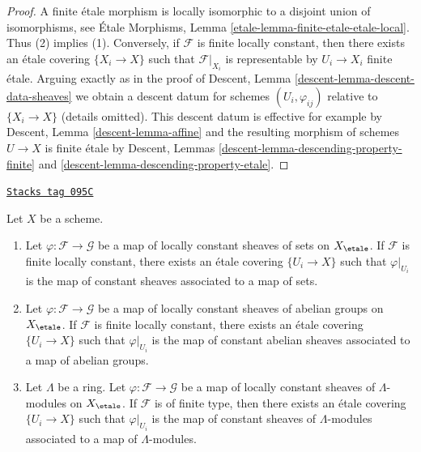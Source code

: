 \begin{proof}
A finite \'etale morphism is locally isomorphic to a disjoint union
of isomorphisms, see
\'Etale Morphisms, Lemma \ref{etale-lemma-finite-etale-etale-local}.
Thus (2) implies (1). Conversely, if $\mathcal{F}$ is finite locally
constant, then there exists an \'etale covering $\{X_i \to X\}$ such that
$\mathcal{F}|_{X_i}$ is representable by $U_i \to X_i$ finite \'etale.
Arguing exactly as in the proof of
Descent, Lemma \ref{descent-lemma-descent-data-sheaves}
we obtain a descent datum for schemes $(U_i, \varphi_{ij})$ relative to
$\{X_i \to X\}$ (details omitted). This descent datum is effective for
example by Descent, Lemma \ref{descent-lemma-affine}
and the resulting morphism of schemes $U \to X$ is finite \'etale
by Descent, Lemmas \ref{descent-lemma-descending-property-finite} and
\ref{descent-lemma-descending-property-etale}.
\end{proof}

\begin{lemma}
\label{etale-cohomology-lemma-morphism-locally-constant}
\href{https://stacks.math.columbia.edu/tag/095C}{\texttt{Stacks tag 095C}}

Let $X$ be a scheme.
\begin{enumerate}
\item Let $\varphi : \mathcal{F} \to \mathcal{G}$ be a map
of locally constant sheaves of sets on $X_\etale$.
If $\mathcal{F}$ is finite locally constant, there exists an
\'etale covering $\{U_i \to X\}$ such that
$\varphi|_{U_i}$ is the map of constant sheaves associated to
a map of sets.
\item Let $\varphi : \mathcal{F} \to \mathcal{G}$ be a map
of locally constant sheaves of abelian groups on $X_\etale$.
If $\mathcal{F}$ is finite locally constant, there exists an \'etale
covering $\{U_i \to X\}$ such that $\varphi|_{U_i}$ is the map of
constant abelian sheaves associated to a map of abelian groups.
\item Let $\Lambda$ be a ring.
Let $\varphi : \mathcal{F} \to \mathcal{G}$ be a map
of locally constant sheaves of $\Lambda$-modules on $X_\etale$.
If $\mathcal{F}$ is of finite type, then there exists an \'etale covering
$\{U_i \to X\}$ such that $\varphi|_{U_i}$ is the map of constant
sheaves of $\Lambda$-modules associated to a map of $\Lambda$-modules.
\end{enumerate}
\end{lemma}

